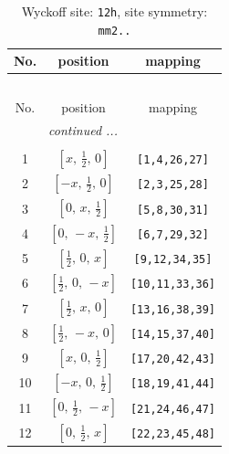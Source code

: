 \documentclass[fleqn,8pt]{jsarticle}
\begin{document}
\begin{longtable}{ccc}
\caption{Wyckoff site: {\tt 12h}, site symmetry: {\tt mm2..}}
 \\
 \hline \hline
No. & position & mapping \\ \hline \endfirsthead

\multicolumn{2}{l}{\tablename\ \thetable{}} \\
 \hline \hline
No. & position & mapping \\ \hline \endhead

 \hline \hline
\multicolumn{2}{r}{\footnotesize\it continued ...} \\ \endfoot

 \hline \hline
\multicolumn{2}{r}{} \\ \endlastfoot

1 & $\left[ x,\, \frac{1}{2},\, 0 \right]$ & {\tt [1,4,26,27]} \\ \hline
2 & $\left[ - x,\, \frac{1}{2},\, 0 \right]$ & {\tt [2,3,25,28]} \\ \hline
3 & $\left[ 0,\, x,\, \frac{1}{2} \right]$ & {\tt [5,8,30,31]} \\ \hline
4 & $\left[ 0,\, - x,\, \frac{1}{2} \right]$ & {\tt [6,7,29,32]} \\ \hline
5 & $\left[ \frac{1}{2},\, 0,\, x \right]$ & {\tt [9,12,34,35]} \\ \hline
6 & $\left[ \frac{1}{2},\, 0,\, - x \right]$ & {\tt [10,11,33,36]} \\ \hline
7 & $\left[ \frac{1}{2},\, x,\, 0 \right]$ & {\tt [13,16,38,39]} \\ \hline
8 & $\left[ \frac{1}{2},\, - x,\, 0 \right]$ & {\tt [14,15,37,40]} \\ \hline
9 & $\left[ x,\, 0,\, \frac{1}{2} \right]$ & {\tt [17,20,42,43]} \\ \hline
10 & $\left[ - x,\, 0,\, \frac{1}{2} \right]$ & {\tt [18,19,41,44]} \\ \hline
11 & $\left[ 0,\, \frac{1}{2},\, - x \right]$ & {\tt [21,24,46,47]} \\ \hline
12 & $\left[ 0,\, \frac{1}{2},\, x \right]$ & {\tt [22,23,45,48]} \\
\end{longtable}
\renewcommand{\arraystretch}{1.2}
\end{document}
